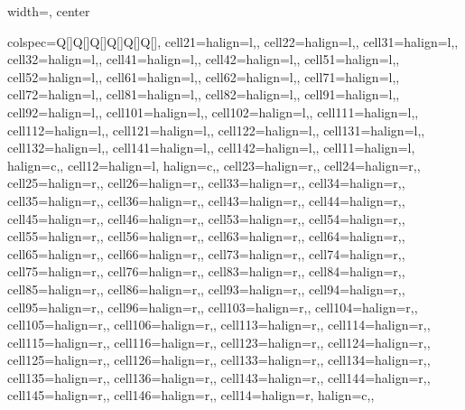 \begin{table}
  \caption{\label{tbl:wra_demog} Demographics of Japanese Americans in 1940 Census and WRA records}
\begin{adjustbox}{width=\textwidth, center}
\begin{tblr}[         %
]                     %
{                     %
colspec={Q[]Q[]Q[]Q[]Q[]Q[]},
cell{2}{1}={}{halign=l,},
cell{2}{2}={}{halign=l,},
cell{3}{1}={}{halign=l,},
cell{3}{2}={}{halign=l,},
cell{4}{1}={}{halign=l,},
cell{4}{2}={}{halign=l,},
cell{5}{1}={}{halign=l,},
cell{5}{2}={}{halign=l,},
cell{6}{1}={}{halign=l,},
cell{6}{2}={}{halign=l,},
cell{7}{1}={}{halign=l,},
cell{7}{2}={}{halign=l,},
cell{8}{1}={}{halign=l,},
cell{8}{2}={}{halign=l,},
cell{9}{1}={}{halign=l,},
cell{9}{2}={}{halign=l,},
cell{10}{1}={}{halign=l,},
cell{10}{2}={}{halign=l,},
cell{11}{1}={}{halign=l,},
cell{11}{2}={}{halign=l,},
cell{12}{1}={}{halign=l,},
cell{12}{2}={}{halign=l,},
cell{13}{1}={}{halign=l,},
cell{13}{2}={}{halign=l,},
cell{14}{1}={}{halign=l,},
cell{14}{2}={}{halign=l,},
cell{1}{1}={}{halign=l, halign=c,},
cell{1}{2}={}{halign=l, halign=c,},
cell{2}{3}={}{halign=r,},
cell{2}{4}={}{halign=r,},
cell{2}{5}={}{halign=r,},
cell{2}{6}={}{halign=r,},
cell{3}{3}={}{halign=r,},
cell{3}{4}={}{halign=r,},
cell{3}{5}={}{halign=r,},
cell{3}{6}={}{halign=r,},
cell{4}{3}={}{halign=r,},
cell{4}{4}={}{halign=r,},
cell{4}{5}={}{halign=r,},
cell{4}{6}={}{halign=r,},
cell{5}{3}={}{halign=r,},
cell{5}{4}={}{halign=r,},
cell{5}{5}={}{halign=r,},
cell{5}{6}={}{halign=r,},
cell{6}{3}={}{halign=r,},
cell{6}{4}={}{halign=r,},
cell{6}{5}={}{halign=r,},
cell{6}{6}={}{halign=r,},
cell{7}{3}={}{halign=r,},
cell{7}{4}={}{halign=r,},
cell{7}{5}={}{halign=r,},
cell{7}{6}={}{halign=r,},
cell{8}{3}={}{halign=r,},
cell{8}{4}={}{halign=r,},
cell{8}{5}={}{halign=r,},
cell{8}{6}={}{halign=r,},
cell{9}{3}={}{halign=r,},
cell{9}{4}={}{halign=r,},
cell{9}{5}={}{halign=r,},
cell{9}{6}={}{halign=r,},
cell{10}{3}={}{halign=r,},
cell{10}{4}={}{halign=r,},
cell{10}{5}={}{halign=r,},
cell{10}{6}={}{halign=r,},
cell{11}{3}={}{halign=r,},
cell{11}{4}={}{halign=r,},
cell{11}{5}={}{halign=r,},
cell{11}{6}={}{halign=r,},
cell{12}{3}={}{halign=r,},
cell{12}{4}={}{halign=r,},
cell{12}{5}={}{halign=r,},
cell{12}{6}={}{halign=r,},
cell{13}{3}={}{halign=r,},
cell{13}{4}={}{halign=r,},
cell{13}{5}={}{halign=r,},
cell{13}{6}={}{halign=r,},
cell{14}{3}={}{halign=r,},
cell{14}{4}={}{halign=r,},
cell{14}{5}={}{halign=r,},
cell{14}{6}={}{halign=r,},
cell{1}{4}={}{halign=r, halign=c,},
}
\end{tblr}
\end{adjustbox}
\end{table}

